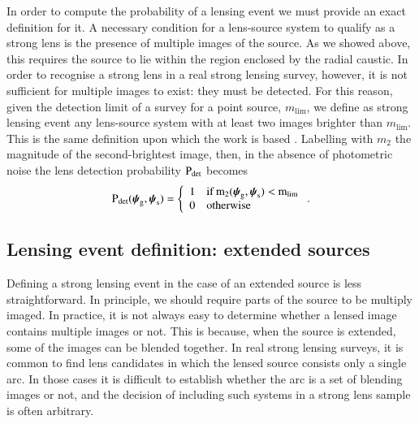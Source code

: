 \documentclass{aa}
\def\psilens{\boldsymbol{\psi}_\mathrm{g}}
\def\psisource{\boldsymbol{\psi}_\mathrm{s}}
\def\pdet{{\rm P}_\mathrm{det}}
\begin{document}
In order to compute the probability of a lensing event we must provide an exact definition for it.
A necessary condition for a lens-source system to qualify as a strong lens is the presence of multiple images of the source.
As we showed above, this requires the source to lie within the region enclosed by the radial caustic.
In order to recognise a strong lens in a real strong lensing survey, however, it is not sufficient for multiple images to exist: they must be detected.
For this reason, given the detection limit of a survey for a point source, $m_{\mathrm{lim}}$, we define as strong lensing event any lens-source system with at least two images brighter than $m_{\mathrm{lim}}$.
This is the same definition upon which the \citet{MVK09} work is based \citep{VMK09}.
Labelling with $m_2$ the magnitude of the second-brightest image, then, in the absence of photometric noise the lens detection probability $\pdet$ becomes
\begin{equation}\label{eq:pointdet}
\pdet(\psilens,\psisource) = \left\{\begin{array}{ll} 1 & \rm{if}\,m_2(\psilens,\psisource) < m_{\mathrm{lim}} \\
0 & \rm{otherwise}\end{array}\right. .
\end{equation}

\subsection{Lensing event definition: extended sources}\label{ssec:lensdefext}

Defining a strong lensing event in the case of an extended source is less straightforward.
In principle, we should require parts of the source to be multiply imaged.
In practice, it is not always easy to determine whether a lensed image contains multiple images or not.
This is because, when the source is extended, some of the images can be blended together.
In real strong lensing surveys, it is common to find lens candidates in which the lensed source consists only a single arc. In those cases it is difficult to establish whether the arc is a set of blending images or not, and the decision of including such systems in a strong lens sample is often arbitrary.
\end{document}
